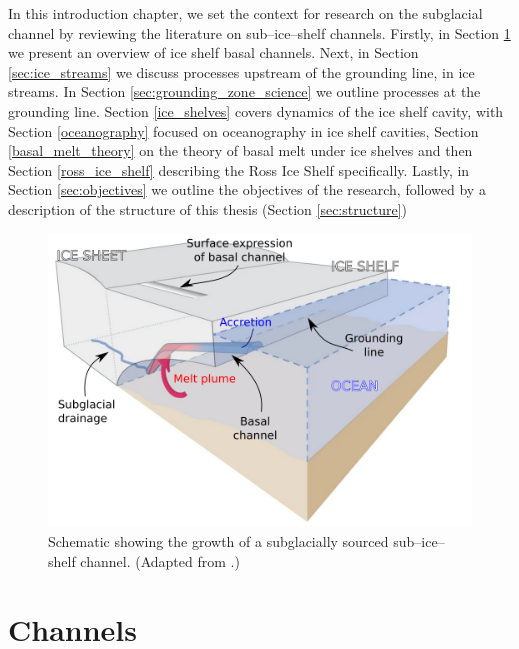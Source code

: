 
In this introduction chapter, we set the context for research on the subglacial channel by reviewing the literature on sub--ice--shelf channels. Firstly, in Section \ref{sec:channels} we present an overview of ice shelf basal channels.  Next, in Section \ref{sec:ice_streams} we discuss processes upstream of the grounding line, in ice streams. In Section \ref{sec:grounding_zone_science} we outline processes at the grounding line. Section \ref{ice_shelves} covers dynamics of the ice shelf cavity, with Section  \ref{oceanography} focused on oceanography in ice shelf cavities, Section \ref{basal_melt_theory} on the theory of basal melt under ice shelves and then Section \ref{ross_ice_shelf} describing the Ross Ice Shelf specifically. Lastly, in Section \ref{sec:objectives} we outline the objectives of the research, followed by a description of the structure of this thesis (Section \ref{sec:structure})

\begin{figure}[!ht]
\centering
\includegraphics[width=1\textwidth]{chapters/1/chennel_schematic.png}
\caption[Channel schematic]{Schematic showing the growth of a subglacially sourced sub--ice--shelf channel. (Adapted from \cite{le2013evidence}.) }
\label{fig:channel_schematic}
\end{figure}  

\section{Channels} \label{sec:channels}

